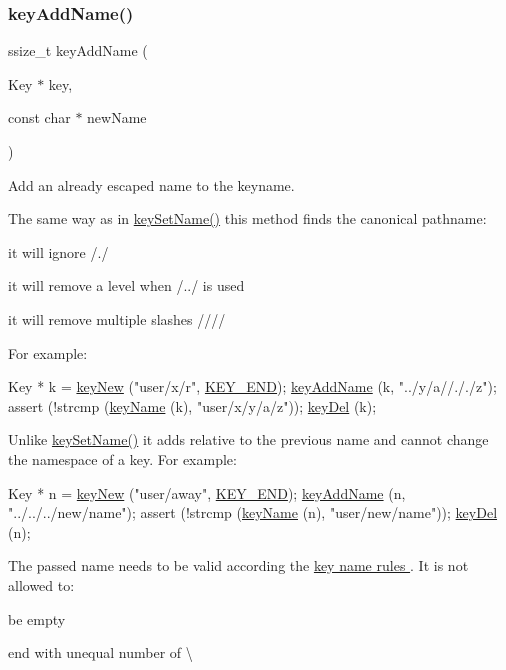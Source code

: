 \subsubsection{\texorpdfstring{key\+Add\+Name()}{keyAddName()}}
{\footnotesize\ttfamily ssize\+\_\+t key\+Add\+Name (\begin{DoxyParamCaption}\item[{Key $\ast$}]{key,  }\item[{const char $\ast$}]{new\+Name }\end{DoxyParamCaption})}



Add an already escaped name to the keyname. 

The same way as in \hyperlink{group__keyname_ga7699091610e7f3f43d2949514a4b35d9}{key\+Set\+Name()} this method finds the canonical pathname\+:
\begin{DoxyItemize}
\item it will ignore /./
\item it will remove a level when /../ is used
\item it will remove multiple slashes ////
\end{DoxyItemize}

For example\+: 
\begin{DoxyCodeInclude}
Key * k = \hyperlink{group__key_gad23c65b44bf48d773759e1f9a4d43b89}{keyNew} (\textcolor{stringliteral}{"user/x/r"}, \hyperlink{group__key_gga91fb3178848bd682000958089abbaf40aa8adb6fcb92dec58fb19410eacfdd403}{KEY\_END});
\hyperlink{group__keyname_gaa70593a2c772c4b7bc33423b9b10a270}{keyAddName} (k, \textcolor{stringliteral}{"../y/a//././z"});
assert (!strcmp (\hyperlink{group__keyname_ga8e805c726a60da921d3736cda7813513}{keyName} (k), \textcolor{stringliteral}{"user/x/y/a/z"}));
\hyperlink{group__key_ga3df95bbc2494e3e6703ece5639be5bb1}{keyDel} (k);
\end{DoxyCodeInclude}
 Unlike \hyperlink{group__keyname_ga7699091610e7f3f43d2949514a4b35d9}{key\+Set\+Name()} it adds relative to the previous name and cannot change the namespace of a key. For example\+: 
\begin{DoxyCodeInclude}
Key * n = \hyperlink{group__key_gad23c65b44bf48d773759e1f9a4d43b89}{keyNew} (\textcolor{stringliteral}{"user/away"}, \hyperlink{group__key_gga91fb3178848bd682000958089abbaf40aa8adb6fcb92dec58fb19410eacfdd403}{KEY\_END});
\hyperlink{group__keyname_gaa70593a2c772c4b7bc33423b9b10a270}{keyAddName} (n, \textcolor{stringliteral}{"../../../new/name"});
assert (!strcmp (\hyperlink{group__keyname_ga8e805c726a60da921d3736cda7813513}{keyName} (n), \textcolor{stringliteral}{"user/new/name"}));
\hyperlink{group__key_ga3df95bbc2494e3e6703ece5639be5bb1}{keyDel} (n);
\end{DoxyCodeInclude}
 The passed name needs to be valid according the \hyperlink{group__keyname}{key name rules }. It is not allowed to\+:
\begin{DoxyItemize}
\item be empty
\item end with unequal number of \textbackslash{}
\end{DoxyItemize}


